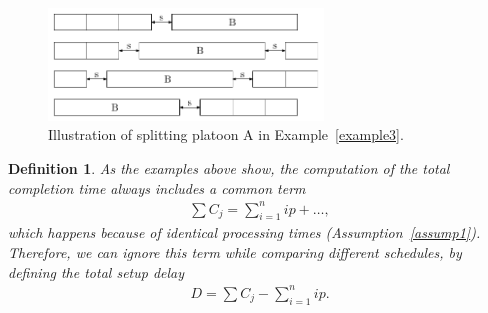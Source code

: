 \documentclass{article}
\theoremstyle{definition}
\theoremstyle{plain}
\newtheorem{define}{Definition}[section]
\begin{document}
\begin{figure}
  \centering
  \includegraphics[width=0.65\textwidth]{figures/platoons.pdf}
  \caption{Illustration of splitting platoon A in Example~\ref{example3}.}
  \label{fig:example3}
\end{figure}

\begin{define}
  As the examples above show, the computation of the total completion time always includes a common term
  \begin{align*}
    \sum C_{j} = \sum_{i=1}^{n} ip + \dots ,
  \end{align*}
  which happens because of identical processing times
  (Assumption~\ref{assump1}). Therefore, we can ignore this term while comparing
  different schedules, by defining the {\normalfont total setup delay}
  \begin{align*}
    D = \sum C_{j} - \sum_{i=1}^{n} ip .
  \end{align*}
\end{define}
\end{document}
